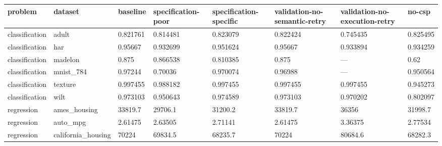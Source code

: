 \begin{tabular}{llllllll}
\hline
problem & dataset & baseline & specification-poor & specification-specific & validation-no-semantic-retry & validation-no-execution-retry & no-csp \\
\hline
classification & adult & 0.821761 & 0.814481 & 0.823079 & 0.822424 & 0.745435 & 0.825495 \\
classification & har & 0.95667 & 0.932699 & 0.951624 & 0.95667 & 0.933894 & 0.934259 \\
classification & madelon & 0.875 & 0.866538 & 0.810385 & 0.875 & — & 0.62 \\
classification & mnist\_784 & 0.97244 & 0.70036 & 0.970074 & 0.96988 & — & 0.950564 \\
classification & texture & 0.997455 & 0.988182 & 0.997455 & 0.997455 & 0.997455 & 0.945273 \\
classification & wilt & 0.973103 & 0.950643 & 0.974589 & 0.973103 & 0.970202 & 0.802097 \\
regression & ames\_housing & 33819.7 & 29706.1 & 31200.2 & 33819.7 & 36356 & 31998.7 \\
regression & auto\_mpg & 2.61475 & 2.63505 & 2.71141 & 2.61475 & 3.36375 & 2.77534 \\
regression & california\_housing & 70224 & 69834.5 & 68235.7 & 70224 & 80684.6 & 68282.3 \\
\hline
\end{tabular}
